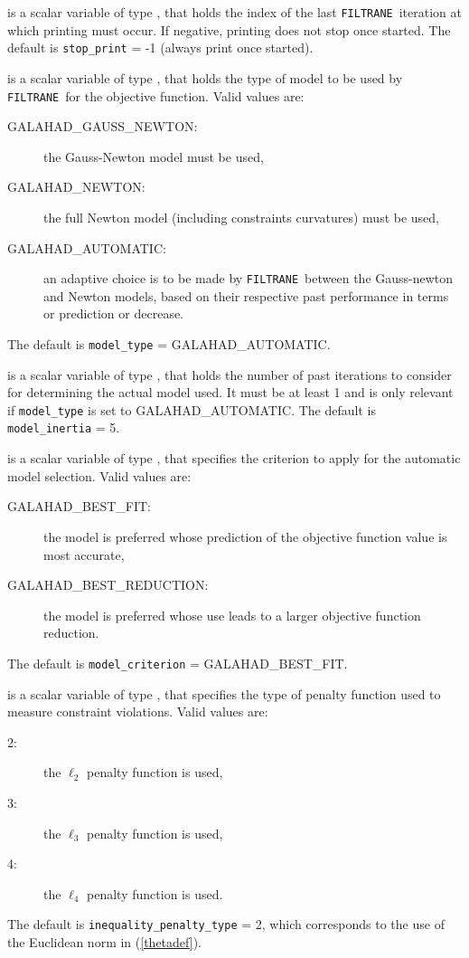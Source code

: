 \documentclass{galahad}
\newcommand{\packagename}{FILTRANE}
\newcommand{\sym}{\sf\small}
\newcommand{\filtrane}{{\tt \packagename}}
\begin{document}
\begin{description}
 is a scalar variable of type \integer, that holds
the index of the last \filtrane\ iteration at which printing must occur. If
negative, printing does not stop once started.
The default is {\tt stop\_print} = -1 (always print once started).

 is a scalar variable of type \integer, that holds
the type of model to be used by \filtrane\ for the objective function.  Valid
values are:
\begin{description}
\item[\sym GALAHAD\_GAUSS\_NEWTON:] the Gauss-Newton model must be used,
\item[\sym GALAHAD\_NEWTON:] the full Newton model (including constraints
curvatures) must be used,
\item[\sym GALAHAD\_AUTOMATIC:] an adaptive choice is to be made by 
\filtrane\ between the Gauss-newton and Newton models, based on their
respective past performance in terms or prediction or decrease.
\end{description}
The default is {\tt model\_type} = {\sym GALAHAD\_AUTOMATIC}.

 is a scalar variable of type \integer, that holds
the number of past iterations to consider for determining the actual model
used. It must be at least 1 and is only relevant if {\tt model\_type}
is set to {\sym GALAHAD\_AUTOMATIC}.
The default is {\tt model\_inertia} = 5.

 is a scalar variable of type \integer, that
specifies the criterion to apply for the automatic model selection. Valid
values are:
\begin{description}
\item[\sym GALAHAD\_BEST\_FIT:] the model is preferred whose prediction of the
objective function value is most accurate,
\item[\sym GALAHAD\_BEST\_REDUCTION:] the model is preferred whose use leads
to a larger objective function reduction.
\end{description}
The default is {\tt model\_criterion} = {\sym GALAHAD\_BEST\_FIT}.

 is a scalar variable of type \integer,
that specifies the type of penalty function used to measure constraint
violations.  Valid values are:
\begin{description}
\item[2:] the $\ell_2$ penalty function is used,
\item[3:] the $\ell_3$ penalty function is used,
\item[4:] the $\ell_4$ penalty function is used.
\end{description}
The default is {\tt inequality\_penalty\_type} = 2, which corresponds to the
use of the Euclidean norm in (\ref{thetadef}).


\end{description}
\end{document}
